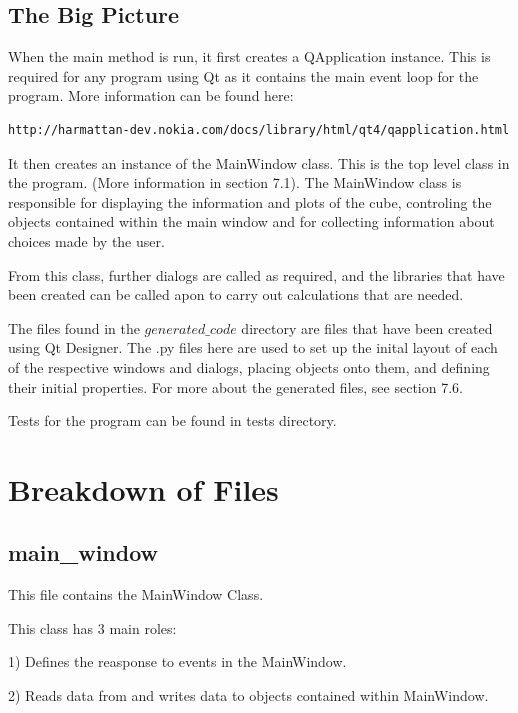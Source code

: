 \documentclass[whitecover]{MO_report}
\begin{document}
\section{The Big Picture}

When the main method is run, it first creates a QApplication instance. This is
required for any program using Qt as it contains the main event loop for the
program. More information can be found here:

\begin{verbatim}
http://harmattan-dev.nokia.com/docs/library/html/qt4/qapplication.html
\end{verbatim}

It then creates an instance of the MainWindow class. This is the top level
class in the program. (More information in section 7.1). The MainWindow
class is responsible for displaying the information and plots of the cube,
controling the objects contained within the main window and for collecting
information about choices made by the user. 

From this class, further dialogs are called as required, and the libraries that
have been created can be called apon to carry out calculations that are needed.

The files found in the $generated\_code$ directory are files that have been
created using Qt Designer. The .py files here are used to set up the inital
layout of each of the respective windows and dialogs, placing objects onto them,
and defining their initial properties. For more about the generated files, see
section 7.6.

Tests for the program can be found in tests directory.


\pagebreak


\chapter{Breakdown of Files}

\section{main\_window}

This file contains the MainWindow Class.

This class has 3 main roles:

1) Defines the reasponse to events in the MainWindow.

2) Reads data from and writes data to objects contained within MainWindow.
\end{document}
